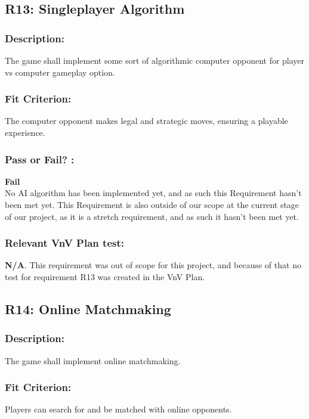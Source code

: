 \documentclass[12pt, titlepage]{article}
\begin{document}
\subsection{R13: Singleplayer Algorithm} 
\label{R13} 

\subsubsection*{Description:} The game shall implement some sort of algorithmic computer opponent for  player vs computer gameplay option.

\subsubsection*{Fit Criterion:} The computer opponent makes legal and strategic moves, ensuring a playable experience.

\subsubsection*{Pass or Fail? :} 

 \noindent \textbf{Fail}\\
 
  No AI algorithm has been implemented yet, and as such this Requirement hasn't been met yet. This Requirement is also outside of our scope at the current stage of our project, as it is a stretch requirement, and as such it hasn't been met yet.

\subsubsection*{Relevant VnV Plan test: } \textbf{N/A}. This requirement was out of scope for this project, and because of that no test for requirement R13 was created in the VnV Plan.


\subsection{R14: Online Matchmaking} 
\label{R14} 

\subsubsection*{Description:}The game shall implement online matchmaking.

\subsubsection*{Fit Criterion:}Players can search for and be matched with online opponents.
\end{document}
